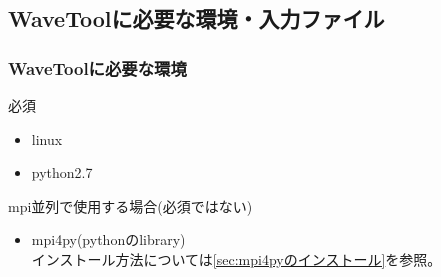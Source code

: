 \documentclass{jsarticle}
\begin{document}

\subsection{WaveToolに必要な環境・入力ファイル}

\subsubsection{WaveToolに必要な環境}
\noindent 必須 \\
\begin{itemize}
\item linux \\
\item python2.7 \\
\end{itemize}

\noindent mpi並列で使用する場合(必須ではない) \\
\begin{itemize}
\item mpi4py(pythonのlibrary) \\
インストール方法については\ref{sec:mpi4pyのインストール}を参照。\\
\end{itemize}

\end{document}
